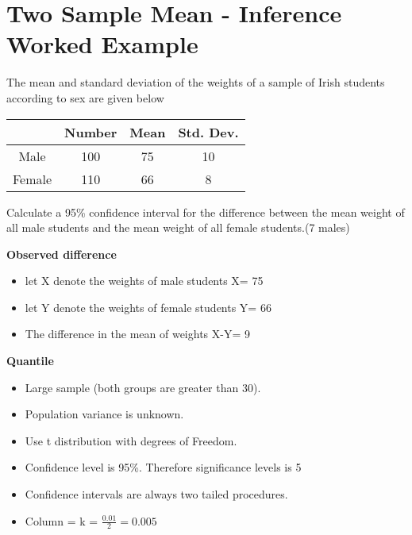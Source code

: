 

\section{Two Sample Mean - Inference Worked Example}
The mean and standard deviation of the weights of a sample of Irish students according to sex are given below

\begin{center}
\begin{tabular}{|c|c|c|c|}\hline
& Number & Mean & Std. Dev. \\ \hline
Male &100&75&10 \\ \hline
Female&110& 66&8 \\  \hline

\end{tabular}
\end{center}


Calculate a 95\% confidence interval for the difference between the mean weight of all male
students and the mean weight of all female students.(7 males)




\noindent \textbf{Observed difference}

\begin{itemize}
\item let X denote the weights of male students    X= 75
\item let Y denote the weights of female students  Y= 66
\item The difference in the mean of weights X-Y= 9
\end{itemize}
\noindent \textbf{Quantile}

\begin{itemize}
\item Large sample (both groups are greater than 30).
\item Population variance is unknown.
\item Use t distribution with  degrees of Freedom.
\item Confidence level is 95\%. Therefore significance levels is 5%
\item Confidence intervals are always two tailed procedures.
\item Column = k = $\frac{0.01}{2}= 0.005$
\end{itemize}

